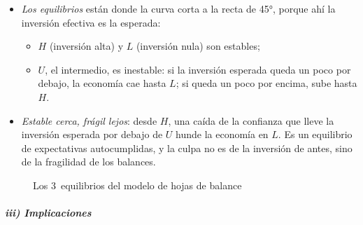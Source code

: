 \documentclass[11pt]{article}
\begin{document}
\begin{itemize}
\begin{enumerate}
  \item con inversión esperada alta, la restricción de crédito no aprieta ($I_F>\bar I$) y la inversión la fija su rentabilidad ($I=\bar I$).
  \end{enumerate}
\item \emph{Los equilibrios} están donde la curva corta a la recta de 45°, porque ahí la inversión efectiva es la esperada:
  \begin{itemize}
  \item $H$ (inversión alta) y $L$ (inversión nula) son estables;
  \item $U$, el intermedio, es inestable: si la inversión esperada queda un poco por debajo, la economía cae hasta $L$; si queda un poco por encima, sube hasta $H$.
  \end{itemize}
\item \emph{Estable cerca, frágil lejos}: desde $H$, una caída de la confianza que lleve la inversión esperada por debajo de $U$ hunde la economía en $L$. Es un equilibrio de expectativas autocumplidas, y la culpa no es de la inversión de antes, sino de la fragilidad de los balances.
\end{itemize}

\begin{figure}[H]
\centering
\caption{Los 3~equilibrios del modelo de hojas de balance}\label{fig:hojas-balance}
\end{figure}

\subparagraph{iii) Implicaciones}
\end{document}
